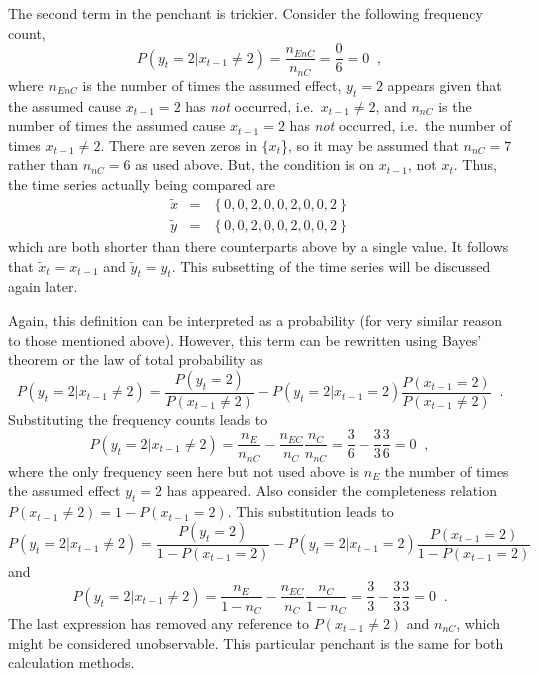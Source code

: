\documentclass[a4paper,11pt,twocolumn]{article}
\begin{document}
The second term in the penchant is trickier.  Consider the following frequency count,
$$
P\left( y_t = 2 | x_{t-1} \neq 2\right) = \frac{n_{EnC}}{n_{nC}} = \frac{0}{6} = 0\;\;,
$$
where $n_{EnC}$ is the number of times the assumed effect, $y_t=2$ appears given that the assumed cause $x_{t-1}=2$ has {\em not} occurred, i.e.\ $x_{t-1}\neq 2$, and $n_{nC}$ is the number of times the assumed cause $x_{t-1}=2$ has {\em not} occurred, i.e.\ the number of times $x_{t-1}\neq 2$.  There are seven zeros in $\{x_t$\}, so it may be assumed that $n_{nC}=7$ rather than $n_{nC}=6$ as used above.  But, the condition is on $x_{t-1}$, not $x_t$.  Thus, the time series actually being compared are
\begin{eqnarray*}
\tilde{x} &=& \left\{0,0,2,0,0,2,0,0,2\right\}\\
\tilde{y} &=& \left\{0,0,2,0,0,2,0,0,2\right\}
\end{eqnarray*}
which are both shorter than there counterparts above by a single value.  It follows that $\tilde{x}_t = x_{t-1}$ and $\tilde{y}_t=y_t$.  This subsetting of the time series will be discussed again later.

Again, this definition can be interpreted as a probability (for very similar reason to those mentioned above).  However, this term can be rewritten using Bayes' theorem or the law of total probability as
$$
P\left( y_t = 2 | x_{t-1} \neq 2\right) = \frac{P\left( y_t = 2 \right)}{P\left( x_{t-1} \neq 2 \right)} - P\left( y_t = 2 | x_{t-1} = 2\right)\frac{P\left( x_{t-1} = 2 \right)}{P\left( x_{t-1} \neq 2 \right)}\;\;.
$$
Substituting the frequency counts leads to
$$
P\left( y_t = 2 | x_{t-1} \neq 2\right) = \frac{n_E}{n_{nC}} - \frac{n_{EC}}{n_C}\frac{n_C}{n_{nC}} = \frac{3}{6} - \frac{3}{3}\frac{3}{6} = 0\;\;,
$$
where the only frequency seen here but not used above is $n_E$ the number of times the assumed effect $y_t=2$ has appeared.  Also consider the completeness relation $P\left( x_{t-1} \neq 2 \right) = 1 - P\left( x_{t-1} = 2 \right)$.  This substitution leads to
$$
P\left( y_t = 2 | x_{t-1} \neq 2\right) = \frac{P\left( y_t = 2 \right)}{1-P\left( x_{t-1} = 2 \right)} - P\left( y_t = 2 | x_{t-1} = 2\right)\frac{P\left( x_{t-1} = 2 \right)}{1-P\left( x_{t-1} = 2 \right)}
$$
and
$$
P\left( y_t = 2 | x_{t-1} \neq 2\right) = \frac{n_E}{1-n_{C}} - \frac{n_{EC}}{n_C}\frac{n_C}{1-n_{C}} = \frac{3}{3} - \frac{3}{3}\frac{3}{3} = 0\;\;.
$$
The last expression has removed any reference to $P\left( x_{t-1} \neq 2 \right)$ and $n_{nC}$, which might be considered unobservable.  This particular penchant is the same for both calculation methods.
\end{document}
